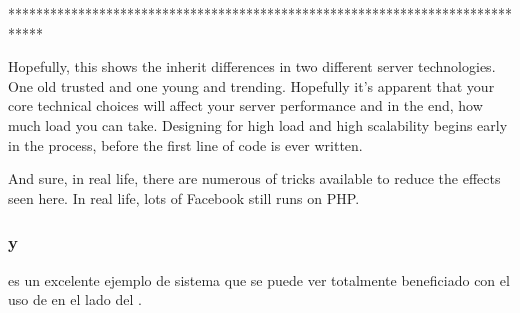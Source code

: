 %
%


*****************************************************************************


Hopefully, this shows the inherit differences in two different server technologies. One old trusted and one young and trending. Hopefully it’s apparent that your core technical choices will affect your server performance and in the end, how much load you can take. Designing for high load and high scalability begins early in the process, before the first line of code is ever written.

And sure, in real life, there are numerous of tricks available to reduce the effects seen here. In real life, lots of Facebook still runs on PHP.


\subsubsection{\nodejsNAME y \ecommerce}

\ecommerce es un excelente ejemplo de sistema que se puede ver totalmente beneficiado con el uso de \nodejsNAME en el lado del \serverAS. 

